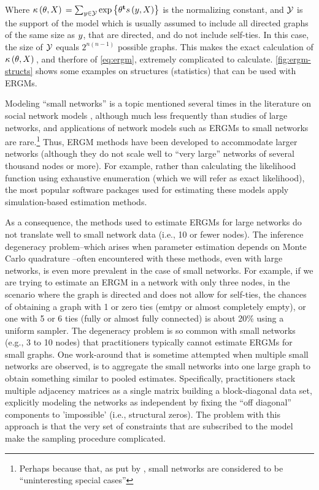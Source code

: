 \documentclass[12pt]{article}
\begin{document}
\noindent Where $\kappa\left(\theta, X\right){} = \sum_{y\in\mathcal{Y}}\mbox{exp}\left\{{\theta}^\mathbf{t}s\left(y, X\right)\right\}$ is the normalizing constant, and $\mathcal{Y}$ is the support of the model which is usually assumed to include all directed graphs of the same size as $y$, that are directed, and do not include self-ties. In this case, the size of $\mathcal{Y}$ equals $2^{n(n-1)}$ possible graphs. This makes the exact calculation of $\kappa\left(\theta, X\right){}$, and therfore of \eqref{eq:ergm}, extremely complicated to calculate. \autoref{fig:ergm-structs} shows some examples on structures (statistics) that can be used with ERGMs.

Modeling ``small networks'' is a topic mentioned several times in the literature on social network models  \cite{Wasserman1996,Frank1986,Snijders2011},  although much less frequently than studies of large networks, and applications of network models such as ERGMs to small networks are rare.\footnote{Perhaps because that, as put by \cite{Snijders2011}, small networks are considered to be ``uninteresting special cases''} Thus, ERGM methods have been developed to accommodate larger networks (although they do not scale well to ``very large'' networks of several thousand nodes or more). For example, rather than calculating the likelihood function using exhaustive enumeration (which we will refer as exact likelihood), the most popular software packages used for estimating these models apply simulation-based estimation methods.

As a consequence, the methods used to estimate ERGMs for large networks do not translate well to small network data (i.e., 10 or fewer nodes). The inference degeneracy problem--which arises when parameter estimation depends on Monte Carlo quadrature \cite{Handcock2003}--often encountered with these methods, even with large networks, is even more prevalent in the case of small networks. For example, if we are trying to estimate an ERGM in a network with only three nodes, in the scenario where the graph is directed and does not allow for self-ties, the chances of obtaining a graph with 1 or zero ties (emtpy or almost completely empty), or one with 5 or 6 ties (fully or almost fully connected) is about 20\% using a uniform sampler. The degeneracy problem is so common with small networks (e.g., 3 to 10 nodes) that practitioners typically cannot estimate ERGMs for small graphs. One work-around that is sometime attempted when multiple small networks are observed, is to aggregate the small networks into one large graph to obtain something similar to pooled estimates. Specifically, practitioners stack multiple adjacency matrices as a single matrix  building a block-diagonal data set, explicitly modeling the networks as independent by fixing the ``off diagonal'' components to 'impossible' (i.e., structural zeros). The problem with this approach is that the very set of constraints that are subscribed to the model make the sampling procedure complicated. 
\end{document}
